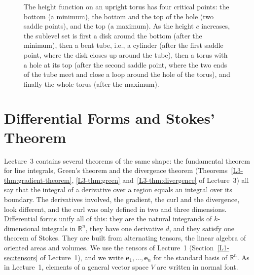 \documentclass[11pt]{article}
\theoremstyle{definition}
\theoremstyle{plain}
\theoremstyle{remark}
\begin{document}
\begin{figure}[ht]
    \centering
    \caption{The height function on an upright torus has four critical points: the bottom (a minimum), the bottom and the top of the hole (two saddle points), and the top (a maximum). As the height $c$ increases, the sublevel set is first a disk around the bottom (after the minimum), then a bent tube, i.e., a cylinder (after the first saddle point, where the disk closes up around the tube), then a torus with a hole at its top (after the second saddle point, where the two ends of the tube meet and close a loop around the hole of the torus), and finally the whole torus (after the maximum).}
    \label{fig:torus}
\end{figure}

\section{Differential Forms and Stokes' Theorem}\label{sec:forms}

Lecture~3 contains several theorems of the same shape: the fundamental theorem for line integrals, Green's theorem and the divergence theorem (Theorems~\ref{L3-thm:gradient-theorem}, \ref{L3-thm:green} and~\ref{L3-thm:divergence} of Lecture~3) all say that the integral of a derivative over a region equals an integral over its boundary. The derivatives involved, the gradient, the curl and the divergence, look different, and the curl was only defined in two and three dimensions. Differential forms unify all of this: they are the natural integrands of $k$-dimensional integrals in $\mathbb{R}^n$, they have one derivative $d$, and they satisfy one theorem of Stokes. They are built from alternating tensors, the linear algebra of oriented areas and volumes. We use the tensors of Lecture~1 (Section~\ref{L1-sec:tensors} of Lecture~1), and we write $\mathbf{e}_1, \ldots, \mathbf{e}_n$ for the standard basis of $\mathbb{R}^n$. As in Lecture~1, elements of a general vector space $V$ are written in normal font.
\end{document}
